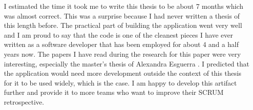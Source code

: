 I estimated the time it took me to write this thesis to be about 7 months which was almost correct. 
This was a surprise because I had never written a thesis of this length before. 
The practical part of building the application went very well and I am proud to say that the code 
is one of the cleanest pieces I have ever written as a software developer that has been employed for about 4 and a half years now.
The papers I have read during the research for this paper were very interesting, especially the master's thesis of Alexandra Esguerra \parencite{AgileProjectHealthIndicatorsThesis}.
I predicted that the application would need more development outside the context of this thesis for it to be used widely, which is the case.
I am happy to develop this artifact further and provide it to more teams who want to improve their SCRUM retrospective.
